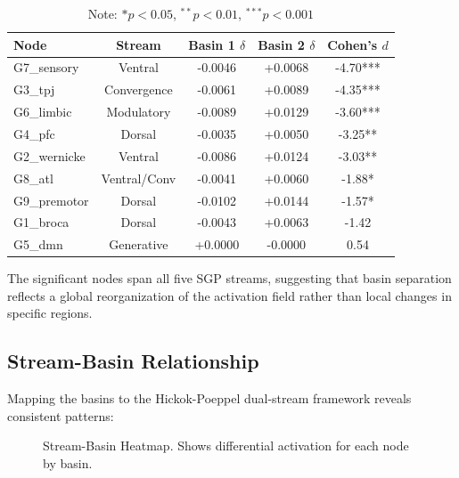 \documentclass[12pt]{article}
\numberwithin{equation}{section}
\begin{document}
\begin{table}[htbp]
	\centering
	\caption{Node Contributions to Basin Separation}
	\label{tab:node_contrib}
	\begin{tabular}{lcccc}
		\toprule
		Node         & Stream       & Basin 1 $\delta$ & Basin 2 $\delta$ & Cohen's $d$ \\
		\midrule
		G7\_sensory  & Ventral      & -0.0046          & +0.0068          & -4.70***    \\
		G3\_tpj      & Convergence  & -0.0061          & +0.0089          & -4.35***    \\
		G6\_limbic   & Modulatory   & -0.0089          & +0.0129          & -3.60***    \\
		G4\_pfc      & Dorsal       & -0.0035          & +0.0050          & -3.25**     \\
		G2\_wernicke & Ventral      & -0.0086          & +0.0124          & -3.03**     \\
		G8\_atl      & Ventral/Conv & -0.0041          & +0.0060          & -1.88*      \\
		G9\_premotor & Dorsal       & -0.0102          & +0.0144          & -1.57*      \\
		G1\_broca    & Dorsal       & -0.0043          & +0.0063          & -1.42       \\
		G5\_dmn      & Generative   & +0.0000          & -0.0000          & 0.54        \\
		\bottomrule
	\end{tabular}
	\caption*{Note: $*p<0.05$, $^{**}p<0.01$, $^{***}p<0.001$}
\end{table}

The significant nodes span all five SGP streams, suggesting that basin separation reflects a global reorganization of the activation field rather than local changes in specific regions.

\subsection{Stream-Basin Relationship}

Mapping the basins to the Hickok-Poeppel dual-stream framework reveals consistent patterns:

\begin{figure}[htbp]
	\centering
	\begin{minipage}{0.45\textwidth}
		\centering
		\caption{Stream-Basin Heatmap. Shows differential activation for each node by basin.}
	\end{minipage}
\end{figure}
\end{document}
